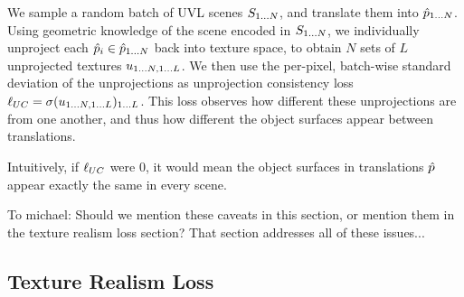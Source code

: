 \documentclass{article}
\begin{document}
	We sample a random batch of UVL scenes $S_{1\dots N}$, and translate them into $\hat{p}_{1\dots N}$.
	Using geometric knowledge of the scene encoded in $S_{1\dots N}$, we individually unproject each $\hat{p}_i \in \hat{p}_{1\dots N}$ back into texture space, to obtain $N$ sets of $L$ unprojected textures $u_{1\dots N, 1\dots L}$.
	We then use the per-pixel, batch-wise standard deviation of the unprojections as unprojection consistency loss $\ell_{UC} = \sigma(u_{1\dots N, 1\dots L})_{1\dots L}$.
	This loss observes how different these unprojections are from one another, and thus how different the object surfaces appear between translations. 

	Intuitively, if $\ell_{UC}$ were $0$, it would mean the object surfaces in translations $\hat{p}$ appear exactly the same in every scene.


	To michael: Should we mention these caveats in this section, or mention them in the texture realism loss section? That section addresses all of these issues...
	

\subsection{Texture Realism Loss}
\label{sec:texture_realism_loss}
\end{document}
